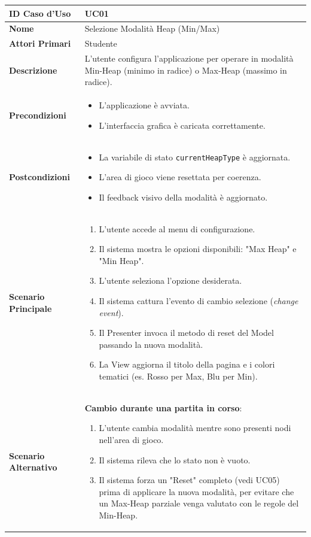 \documentclass[openany]{theme/uniprthesis}
\begin{document}
\begin{xltabular}{\textwidth}{|l|X|}
\hline
\textbf{ID Caso d'Uso} & UC01 \\
\hline
\textbf{Nome} & Selezione Modalità Heap (Min/Max) \\
\hline
\textbf{Attori Primari} & Studente \\
\hline
\textbf{Descrizione} & L'utente configura l'applicazione per operare in modalità Min-Heap (minimo in radice) o Max-Heap (massimo in radice). \\
\hline
\textbf{Precondizioni} & \begin{itemize}
    \item L'applicazione è avviata.
    \item L'interfaccia grafica è caricata correttamente.
\end{itemize} \\
\hline
\textbf{Postcondizioni} & \begin{itemize}
    \item La variabile di stato \texttt{currentHeapType} è aggiornata.
    \item L'area di gioco viene resettata per coerenza.
    \item Il feedback visivo della modalità è aggiornato.
\end{itemize} \\
\hline
\textbf{Scenario Principale} & \begin{enumerate}
    \item L'utente accede al menu di configurazione.
    \item Il sistema mostra le opzioni disponibili: "Max Heap" e "Min Heap".
    \item L'utente seleziona l'opzione desiderata.
    \item Il sistema cattura l'evento di cambio selezione (\textit{change event}).
    \item Il Presenter invoca il metodo di reset del Model passando la nuova modalità.
    \item La View aggiorna il titolo della pagina e i colori tematici (es. Rosso per Max, Blu per Min).
\end{enumerate} \\
\hline
\textbf{Scenario Alternativo} & \textbf{Cambio durante una partita in corso}:
\begin{enumerate}
    \item L'utente cambia modalità mentre sono presenti nodi nell'area di gioco.
    \item Il sistema rileva che lo stato non è vuoto.
    \item Il sistema forza un "Reset" completo (vedi UC05) prima di applicare la nuova modalità, per evitare che un Max-Heap parziale venga valutato con le regole del Min-Heap.
\end{enumerate} \\
\hline
\end{xltabular}
\end{document}
